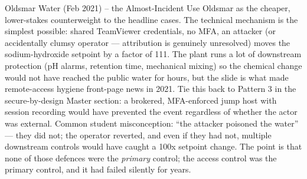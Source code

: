 \documentclass[aspectratio=169,11pt]{beamer}
\begin{document}
\begin{frame}{Oldsmar Water (Feb 2021) -- the Almost-Incident}
{  Use Oldsmar as the cheaper, lower-stakes counterweight to the headline cases. The technical mechanism is the simplest possible: shared TeamViewer credentials, no MFA, an attacker (or accidentally clumsy operator --- attribution is genuinely unresolved) moves the sodium-hydroxide setpoint by a factor of 111. The plant runs a lot of downstream protection (pH alarms, retention time, mechanical mixing) so the chemical change would not have reached the public water for hours, but the slide is what made remote-access hygiene front-page news in 2021. Tie this back to Pattern 3 in the secure-by-design Master section: a brokered, MFA-enforced jump host with session recording would have prevented the event regardless of whether the actor was external. Common student misconception: ``the attacker poisoned the water'' --- they did not; the operator reverted, and even if they had not, multiple downstream controls would have caught a 100x setpoint change. The point is that none of those defences were the \emph{primary} control; the access control was the primary control, and it had failed silently for years.
}
\end{frame}

\end{document}
